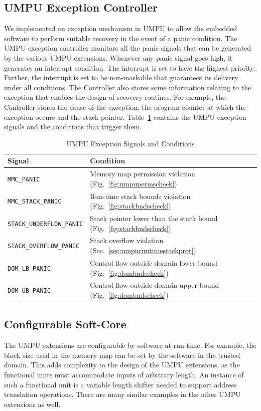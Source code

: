 \subsection{UMPU Exception Controller}
%
We implemented an exception mechanism in UMPU to allow the
embedded software to perform suitable recovery in the event of a panic
condition.
%
The UMPU exception controller monitors all the panic signals that can
be generated by the various UMPU extensions.
%
Whenever any panic signal goes high, it generates an interrupt
condition.
%
The interrupt is set to have the highest priority.
%
Further, the interrupt is set to be non-maskable that guarantees its
delivery under all conditions.
%
The Controller also stores some information relating to the exception
that enables the design of recovery routines.
%
For example, the Controller stores the cause of the exception, the
program counter at which the exception occurs and the stack pointer.
%
Table~\ref{tab:umpuexceptions} contains the UMPU exception signals and
the conditions that trigger them.
%
\begin{table}[htdp]
\centering
\small{
\begin{tabular}{|l|l|}
	\hline
	Signal & Condition\\
	\hline
	\texttt{MMC\_PANIC} & Memory map permission violation
        (Fig.~\ref{fig:umpupermscheck})\\
	\texttt{MMC\_STACK\_PANIC} & Run-time stack bounds violation
        (Fig.~\ref{fig:stackbndscheck})\\
	\texttt{STACK\_UNDERFLOW\_PANIC} & Stack pointer lower than
        the stack bound (Fig.~\ref{fig:stackbndscheck}) \\
	\texttt{STACK\_OVERFLOW\_PANIC} & Stack overflow violation
        (Sec.~\ref{sec:umpuruntimestackprot})\\
        \texttt{DOM\_LB\_PANIC} & Control flow outside domain lower
        bound (Fig.~\ref{fig:dombndscheck})\\
        \texttt{DOM\_UB\_PANIC} & Control flow outside domain upper
        bound (Fig.~\ref{fig:dombndscheck})\\
	\hline
\end{tabular}}
\caption{UMPU Exception Signals and Conditions}
\label{tab:umpuexceptions}
\end{table}

\subsection{Configurable Soft-Core}
%
The UMPU extensions are
configurable by software at run-time.
%
For example, the block size used in the memory map can be set by
the software in the trusted domain.
%
This adds complexity to the design of the UMPU extensions, as the
functional units must accommodate inputs of arbitrary length.
%
An instance of such a functional unit is a variable length shifter
needed to support address translation operations.
%
There are many similar examples in the other UMPU extensions as well.

